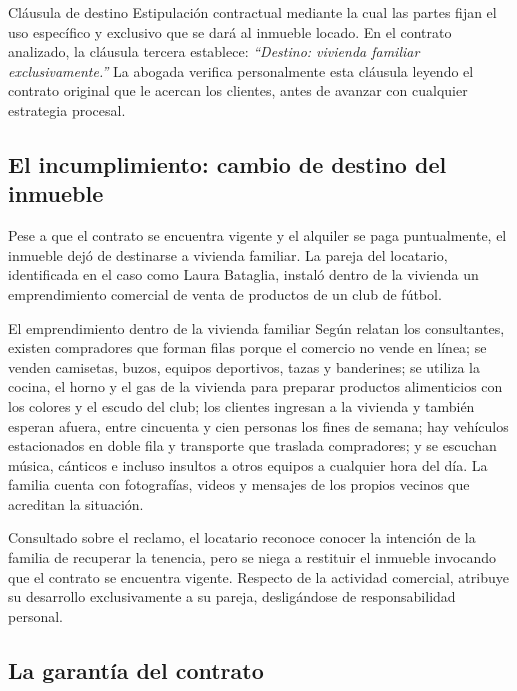\documentclass[12pt,oneside]{book}
\begin{document}
\begin{definition}{Cláusula de destino}
Estipulación contractual mediante la cual las partes fijan el uso específico y exclusivo que se dará al inmueble locado. En el contrato analizado, la cláusula tercera establece: \textit{``Destino: vivienda familiar exclusivamente.''} La abogada verifica personalmente esta cláusula leyendo el contrato original que le acercan los clientes, antes de avanzar con cualquier estrategia procesal.
\end{definition}

\subsection{El incumplimiento: cambio de destino del inmueble}

Pese a que el contrato se encuentra vigente y el alquiler se paga puntualmente, el inmueble dejó de destinarse a vivienda familiar. La pareja del locatario, identificada en el caso como Laura Bataglia, instaló dentro de la vivienda un emprendimiento comercial de venta de productos de un club de fútbol.

\begin{example}{El emprendimiento dentro de la vivienda familiar}
Según relatan los consultantes, existen compradores que forman filas porque el comercio no vende en línea; se venden camisetas, buzos, equipos deportivos, tazas y banderines; se utiliza la cocina, el horno y el gas de la vivienda para preparar productos alimenticios con los colores y el escudo del club; los clientes ingresan a la vivienda y también esperan afuera, entre cincuenta y cien personas los fines de semana; hay vehículos estacionados en doble fila y transporte que traslada compradores; y se escuchan música, cánticos e incluso insultos a otros equipos a cualquier hora del día. La familia cuenta con fotografías, videos y mensajes de los propios vecinos que acreditan la situación.
\end{example}

Consultado sobre el reclamo, el locatario reconoce conocer la intención de la familia de recuperar la tenencia, pero se niega a restituir el inmueble invocando que el contrato se encuentra vigente. Respecto de la actividad comercial, atribuye su desarrollo exclusivamente a su pareja, desligándose de responsabilidad personal.

\subsection{La garantía del contrato}
\end{document}
